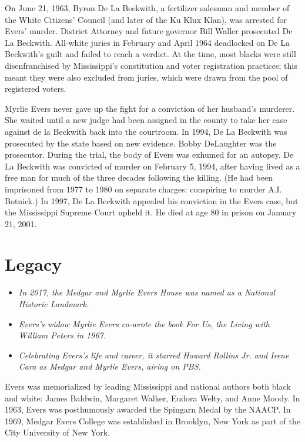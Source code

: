 On June 21, 1963, Byron De La Beckwith, a fertilizer salesman and member
of the White Citizens' Council (and later of the Ku Klux Klan), was
arrested for Evers' murder. District Attorney and future governor Bill
Waller prosecuted De La Beckwith. All-white juries in February and April
1964 deadlocked on De La Beckwith's guilt and failed to reach a verdict.
At the time, most blacks were still disenfranchised by Mississippi's
constitution and voter registration practices; this meant they were also
excluded from juries, which were drawn from the pool of registered
voters.

Myrlie Evers never gave up the fight for a conviction of her husband's
murderer. She waited until a new judge had been assigned in the county
to take her case against de la Beckwith back into the courtroom. In
1994, De La Beckwith was prosecuted by the state based on new evidence.
Bobby DeLaughter was the prosecutor. During the trial, the body of Evers
was exhumed for an autopsy. De La Beckwith was convicted of murder on
February 5, 1994, after having lived as a free man for much of the three
decades following the killing. (He had been imprisoned from 1977 to 1980
on separate charges: conspiring to murder A.I. Botnick.) In 1997, De La
Beckwith appealed his conviction in the Evers case, but the Mississippi
Supreme Court upheld it. He died at age 80 in prison on January 21,
2001.

\section{Legacy}\label{legacy}

\begin{itemize}
\item
  \emph{In 2017, the Medgar and Myrlie Evers House was named as a
  National Historic Landmark.}
\item
  \emph{Evers's widow Myrlie Evers co-wrote the book For Us, the Living
  with William Peters in 1967.}
\item
  \emph{Celebrating Evers's life and career, it starred Howard Rollins
  Jr. and Irene Cara as Medgar and Myrlie Evers, airing on PBS.}
\end{itemize}

Evers was memorialized by leading Mississippi and national authors both
black and white: James Baldwin, Margaret Walker, Eudora Welty, and Anne
Moody. In 1963, Evers was posthumously awarded the Spingarn Medal by the
NAACP. In 1969, Medgar Evers College was established in Brooklyn, New
York as part of the City University of New York.

